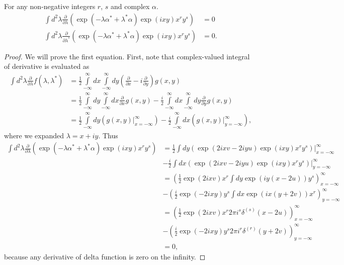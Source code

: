 \begin{lemma}
\label{lmm:formalism:c-numbers:zero-integrals}
For any non-negative integers $r$, $s$ and complex $\alpha$.
\begin{equation*}
\begin{split}
	\int d^2\lambda
		\frac{\partial}{\partial \lambda} \left(
			\exp(-\lambda \alpha^* + \lambda^* \alpha)
			\exp(ixy) x^r y^s
		\right)
	& = 0 \\
	\int d^2\lambda
		\frac{\partial}{\partial \lambda^*}
		\left(
			\exp(-\lambda \alpha^* + \lambda^* \alpha)
			\exp(ixy) x^r y^s
		\right)
	& = 0.
\end{split}
\end{equation*}
\end{lemma}
\begin{proof}
We will prove the first equation.
First, note that complex-valued integral of derivative is evaluated as
\begin{equation*}
\begin{split}
	\int d^2\lambda \frac{\partial}{\partial \lambda} f(\lambda, \lambda^*)
	& = \frac{1}{2} \int\limits_{-\infty}^{\infty} dx \int\limits_{-\infty}^{\infty} dy
		\left( \frac{\partial}{\partial x} - i \frac{\partial}{\partial y} \right)
		g(x, y) \\
	& = \frac{1}{2} \int\limits_{-\infty}^{\infty} dy \int\limits_{-\infty}^{\infty} dx
			\frac{\partial}{\partial x} g(x, y)
		- \frac{i}{2} \int\limits_{-\infty}^{\infty} dx \int\limits_{-\infty}^{\infty} dy
			\frac{\partial}{\partial y} g(x, y) \\
	& =	\frac{1}{2} \int\limits_{-\infty}^{\infty} dy \left(
			\left. g(x, y) \right|_{x=-\infty}^{\infty}
		\right)
		- \frac{i}{2} \int\limits_{-\infty}^{\infty} dx \left(
			\left. g(x, y) \right|_{y=-\infty}^{\infty}
		\right),
\end{split}
\end{equation*}
where we expanded $\lambda = x + iy$.
Thus
\begin{equation*}
\begin{split}
	\int d^2\lambda
		\frac{\partial}{\partial \lambda} \left(
			\exp(-\lambda \alpha^* + \lambda^* \alpha)
			\exp(ixy) x^r y^s
		\right)
	& = \frac{1}{2} \int dy \left. \left(
			\exp(2ixv - 2iyu) \exp(ixy) x^r y^s
		\right) \right|_{x = -\infty}^\infty \\
	& - \frac{i}{2} \int dx \left. \left(
			\exp(2ixv - 2iyu) \exp(ixy) x^r y^s
		\right) \right|_{y = -\infty}^\infty \\
	& = \left(
			\frac{1}{2} \exp(2ixv) x^r \int dy \exp(iy(x-2u)) y^s
		\right)_{x = -\infty}^\infty \\
	& - \left(
			\frac{i}{2} \exp(-2ixy) y^s \int dx \exp(ix(y+2v)) x^r
		\right)_{y = -\infty}^\infty \\
	& = \left(
			\frac{1}{2} \exp(2ixv) x^r 2 \pi i^s \delta^{(s)}(x-2u)
		\right)_{x = -\infty}^\infty \\
	& - \left(
			\frac{i}{2} \exp(-2ixy) y^s 2 \pi i^r \delta^{(r)}(y+2v)
		\right)_{y = -\infty}^\infty \\
	& = 0,
\end{split}
\end{equation*}
because any derivative of delta function is zero on the infinity.
\end{proof}
